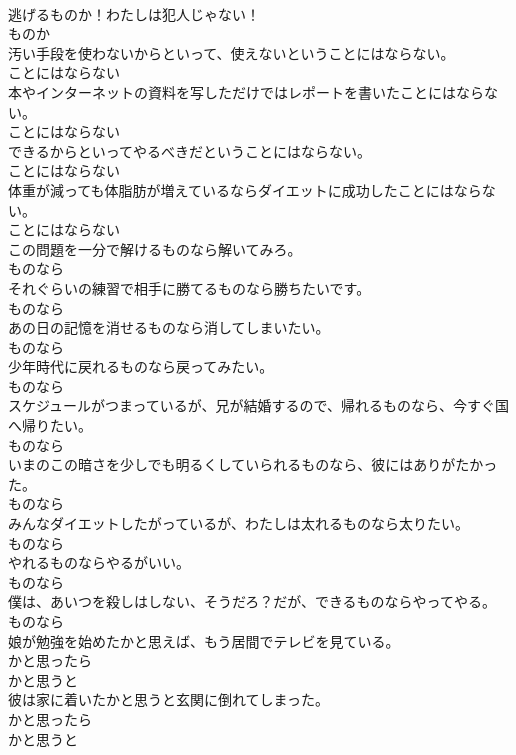 \documentclass[8pt]{extreport}
\begin{document}
\begin{CJK}{UTF8}{min}
\\	逃げるものか！わたしは犯人じゃない！	
\\	ものか
\\	汚い手段を使わないからといって、使えないということにはならない。	
\\	ことにはならない
\\	本やインターネットの資料を写しただけではレポートを書いたことにはならない。	
\\	ことにはならない
\\	できるからといってやるべきだということにはならない。	
\\	ことにはならない
\\	体重が減っても体脂肪が増えているならダイエットに成功したことにはならない。	
\\	ことにはならない
\\	この問題を一分で解けるものなら解いてみろ。	
\\	ものなら
\\	それぐらいの練習で相手に勝てるものなら勝ちたいです。	
\\	ものなら
\\	あの日の記憶を消せるものなら消してしまいたい。	
\\	ものなら
\\	少年時代に戻れるものなら戻ってみたい。	
\\	ものなら
\\	スケジュールがつまっているが、兄が結婚するので、帰れるものなら、今すぐ国へ帰りたい。	
\\	ものなら
\\	いまのこの暗さを少しでも明るくしていられるものなら、彼にはありがたかった。	
\\	ものなら
\\	みんなダイエットしたがっているが、わたしは太れるものなら太りたい。	
\\	ものなら
\\	やれるものならやるがいい。	
\\	ものなら
\\	僕は、あいつを殺しはしない、そうだろ？だが、できるものならやってやる。	
\\	ものなら
\\	娘が勉強を始めたかと思えば、もう居間でテレビを見ている。	
\\	かと思ったら 
\\	かと思うと
\\	彼は家に着いたかと思うと玄関に倒れてしまった。	
\\	かと思ったら 
\\	かと思うと

\end{CJK}
\end{document}
